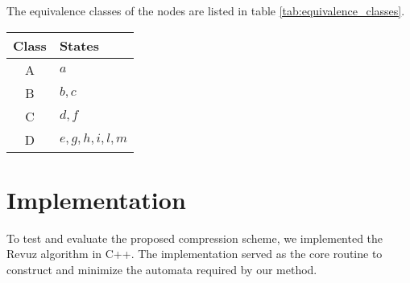 \begin{example}
    The equivalence classes of the nodes are listed in table \cref{tab:equivalence_classes}.
    \begin{center}
        \begin{tabular}{|c|l|}
        \hline
        \textbf{Class} & \textbf{States} \\
        \hline
        A & $a$ \\
        B & $b, c$ \\
        C & $d, f$ \\
        D & $e, g, h, i, l, m$ \\
        \hline
        \end{tabular}
        \label{tab:equivalence_classes}
    \end{center}
\end{example}

\section{Implementation}
To test and evaluate the proposed compression scheme, we implemented the Revuz algorithm in C++. The implementation served as the core routine to construct and minimize the automata required by our method.
